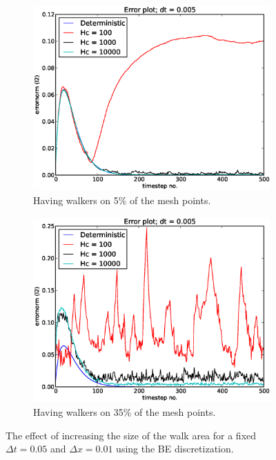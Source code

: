 \begin{figure}[H]
\centering
\begin{subfigure}[b]{0.48\textwidth}
 \includegraphics[width=\textwidth]{../doc/results/experiment_16042014_1139_convergence_tests_etc/results/errorplot.eps}
 \caption{Having walkers on 5\% of the mesh points.}
 \label{errorplot_BE1D_walk_5_percent}
\end{subfigure}
\begin{subfigure}[b]{0.48\textwidth}
 \includegraphics[width=\textwidth]{../doc/results/experiment_16042014_1202_tests_35percent_walkers/results/errorplot.eps}
 \caption{Having walkers on 35\% of the mesh points.}
 \label{errorplot_BE1D_walk_35_percent}
\end{subfigure}
\caption{The effect of increasing the size of the walk area for a fixed $\Delta t = 0.05$ and $\Delta x = 0.01$ using the BE discretization.}
\label{testing_walk_area_size_BE}
\end{figure}

